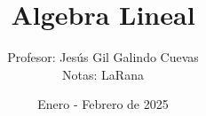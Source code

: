 \documentclass{IEEEtran}
\title{Algebra Lineal}
\author{Profesor: Jes\'{u}s Gil Galindo Cuevas\\Notas: LaRana}
\date{Enero - Febrero de 2025}
\begin{document}
\maketitle



\newpage

%


\newpage
\twocolumn




\end{document}
